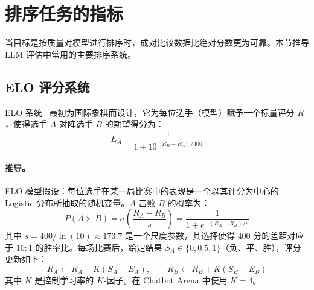 \section{排序任务的指标}
\label{subsec:ranking-metrics}

当目标是按质量对模型进行排序时，成对比较数据比绝对分数更为可靠。本节推导 LLM 评估中常用的主要排序系统。

\subsection{ELO 评分系统}
\label{elo-rating-system}

ELO 系统~\cite{elo1978rating} 最初为国际象棋而设计，它为每位选手（模型）赋予一个标量评分 $R$，使得选手 $A$ 对阵选手 $B$ 的期望得分为：
\begin{equation}
    E_A = \frac{1}{1 + 10^{(R_B - R_A)/400}}
\end{equation}

\paragraph{推导。}
\label{derivation.}

ELO 模型假设：每位选手在某一局比赛中的表现是一个以其评分为中心的 Logistic 分布所抽取的随机变量。$A$ 击败 $B$ 的概率为：
\begin{equation}
    P(A \succ B) = \sigma\!\left(\frac{R_A - R_B}{s}\right) = \frac{1}{1 + e^{-(R_A - R_B)/s}}
\end{equation}
其中 $s = 400/\ln(10) \approx 173.7$ 是一个尺度参数，其选择使得 400 分的差距对应于 $10:1$ 的胜率比。每场比赛后，给定结果 $S_A \in \{0, 0.5, 1\}$（负、平、胜），评分更新如下：
\begin{equation}
    R_A \leftarrow R_A + K(S_A - E_A), \qquad R_B \leftarrow R_B + K(S_B - E_B)
\end{equation}
其中 $K$ 是控制学习率的 $K$-因子。在 Chatbot Arena 中使用 $K = 4$。

